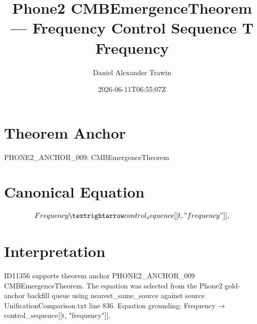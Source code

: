 \documentclass[11pt]{article}
\title{Phone2 CMBEmergenceTheorem — Frequency Control Sequence T Frequency}
\author{Daniel Alexander Trawin}
\date{2026-06-11T06:55:07Z}
\begin{document}
\maketitle
\section*{Theorem Anchor}
PHONE2_ANCHOR_009: CMBEmergenceTheorem
\section*{Canonical Equation}
\[
Frequency → control_sequence[[t, "frequency"]],
\]
\section*{Interpretation}
ID11356 supports theorem anchor PHONE2_ANCHOR_009 CMBEmergenceTheorem. The equation was selected from the Phone2 gold-anchor backfill queue using nearest_same_source against source UnificationComparison.txt line 836. Equation grounding: Frequency → control_sequence[[t, "frequency"]],
\end{document}
